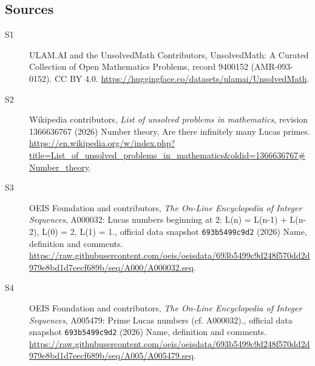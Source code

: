 \documentclass[11pt]{article}
\begin{document}
\subsection{Sources}
\begin{description}
\item[\hypertarget{source:9400152:1}{S1}] ULAM.AI and the UnsolvedMath Contributors, UnsolvedMath: A Curated Collection of Open Mathematics Problems, record 9400152 (AMR-093-0152). CC BY 4.0. \url{https://huggingface.co/datasets/ulamai/UnsolvedMath}.
\item[\hypertarget{source:9400152:2}{S2}] Wikipedia contributors, \emph{List of unsolved problems in mathematics}, revision 1366636767 (2026) Number theory, Are there infinitely many Lucas primes. \url{https://en.wikipedia.org/w/index.php?title=List_of_unsolved_problems_in_mathematics&oldid=1366636767#Number_theory}.
\item[\hypertarget{source:9400152:3}{S3}] OEIS Foundation and contributors, \emph{The On-Line Encyclopedia of Integer Sequences}, A000032: Lucas numbers beginning at 2: L(n) = L(n-1) + L(n-2), L(0) = 2, L(1) = 1., official data snapshot \texttt{693b5499c9d2} (2026) Name, definition and comments. \url{https://raw.githubusercontent.com/oeis/oeisdata/693b5499c9d248f570dd2d979e8bd1d7eecf689b/seq/A000/A000032.seq}.
\item[\hypertarget{source:9400152:4}{S4}] OEIS Foundation and contributors, \emph{The On-Line Encyclopedia of Integer Sequences}, A005479: Prime Lucas numbers (cf. A000032)., official data snapshot \texttt{693b5499c9d2} (2026) Name, definition and comments. \url{https://raw.githubusercontent.com/oeis/oeisdata/693b5499c9d248f570dd2d979e8bd1d7eecf689b/seq/A005/A005479.seq}.
\end{description}
\label{end:9400152}
\end{document}
